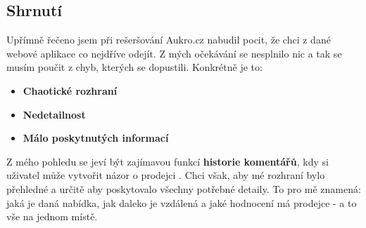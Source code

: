 
\newpage
\subsection{Shrnutí}
Upřímně řečeno jsem při rešeršování Aukro.cz nabudil pocit, že chci z dané webové aplikace co nejdříve odejít. Z mých očekávání se nesplnilo nic a tak se musím poučit z chyb, kterých se dopustili. Konkrétně je to:
\begin{itemize}
    \item \textbf{Chaotické rozhraní}
    \item \textbf{Nedetailnost}
    \item \textbf{Málo poskytnutých informací}
\end{itemize}

Z mého pohledu se jeví být zajímavou funkcí \textbf{historie komentářů}, kdy si uživatel může vytvořit názor o prodejci . Chci však, aby mé rozhraní bylo přehledné a určitě aby poskytovalo všechny potřebné detaily. To pro mě znamená: jaká je daná nabídka, jak daleko je vzdálená a jaké hodnocení má prodejce - a to vše na jednom místě.